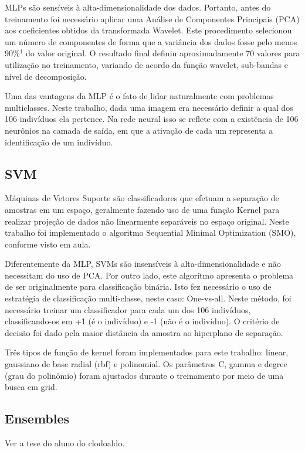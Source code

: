 \documentclass[conference]{IEEEtran}
\begin{document}
MLPs são sensíveis à alta-dimensionalidade dos dados. Portanto, antes do treinamento foi necessário aplicar uma Análise de Componentes Principais (PCA) aos coeficientes obtidos da transformada Wavelet. Este procedimento selecionou um número de componentes de forma que a variância dos dados fosse pelo menos 90\%$^1$ do valor original. O resultado final definiu aproximadamente 70 valores para utilização no treinamento, variando de acordo da função wavelet, sub-bandas e nível de decomposição.

Uma das vantagens da MLP é o fato de lidar naturalmente com problemas multiclasses. Neste trabalho, dada uma imagem era necessário definir a qual dos 106 indivíduos ela pertence. Na rede neural isso se reflete com a existência de 106 neurônios na camada de saída, em que a ativação de cada um representa a identificação de um indivíduo.


\subsection{SVM}
Máquinas de Vetores Suporte são classificadores que efetuam a separação de amostras em um espaço, geralmente fazendo uso de uma função Kernel para realizar projeção de dados não linearmente separáveis no espaço original. Neste trabalho foi implementado o algoritmo Sequential Minimal Optimization (SMO), conforme visto em aula. 

Diferentemente da MLP, SVMs são insensíveis à alta-dimensionalidade e não necessitam do uso de PCA. Por outro lado, este algorítmo apresenta o problema de ser originalmente para classificação binária. Isto fez necessário o uso de estratégia de classificação multi-classe, neste caso: One-vs-all. Neste método, foi necessário treinar um classificador para cada um dos 106 indivíduos, classificando-os em +1 (é o indivíduo) e -1 (não é o indivíduo). O critério de decisão foi dado pela maior distância da amostra ao hiperplano de separação.

Três tipos de função de kernel foram implementados para este trabalho: linear, gaussiano de base radial (rbf) e polinomial. Os parâmetros C, gamma e degree (grau do polinômio) foram ajustados durante o treinamento por meio de uma busca em grid.

\subsection{Ensembles}
Ver a tese do aluno do clodoaldo.
\end{document}
